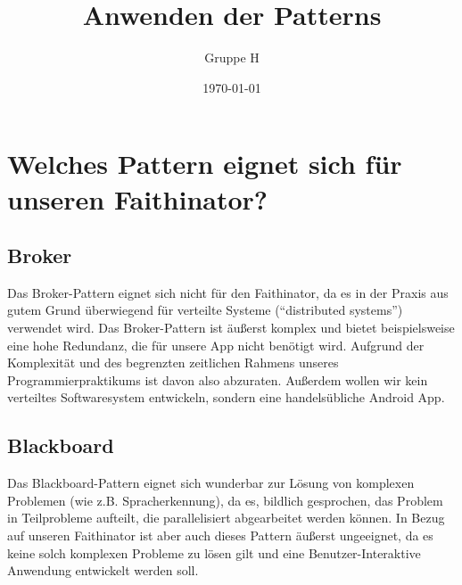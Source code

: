 \documentclass{scrreprt}
\title{Anwenden der Patterns}
\author{Gruppe H}
\date{\today}
\begin{document}
\maketitle
\tableofcontents

\chapter{Welches Pattern eignet sich für unseren Faithinator?}

\section{Broker}
Das Broker-Pattern eignet sich nicht für den Faithinator, da es in der Praxis aus gutem Grund überwiegend für verteilte Systeme (“distributed systems”) verwendet wird. Das Broker-Pattern ist äußerst komplex und bietet beispielsweise eine hohe Redundanz, die für unsere App nicht benötigt wird. Aufgrund der Komplexität und des begrenzten zeitlichen Rahmens unseres Programmierpraktikums ist davon also abzuraten. Außerdem wollen wir kein verteiltes Softwaresystem entwickeln, sondern eine handelsübliche Android App.

\section{Blackboard}
Das Blackboard-Pattern eignet sich wunderbar zur Lösung von komplexen Problemen (wie z.B. Spracherkennung), da es, bildlich gesprochen, das Problem in Teilprobleme aufteilt, die parallelisiert abgearbeitet werden können. In Bezug auf unseren Faithinator ist aber auch dieses Pattern äußerst ungeeignet, da es keine solch komplexen Probleme zu lösen gilt und eine Benutzer-Interaktive Anwendung entwickelt werden soll.
\end{document}
